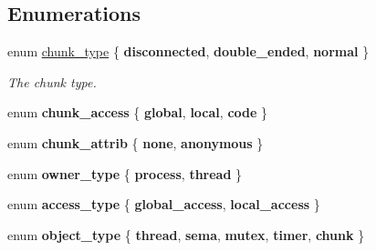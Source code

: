 \subsection*{Enumerations}
\begin{DoxyCompactItemize}
\item 
\mbox{\label{namespaceeka2l1_1_1kernel_aee9c57d72d8825de61cb11d4396438ed}} 
enum \mbox{\hyperlink{namespaceeka2l1_1_1kernel_aee9c57d72d8825de61cb11d4396438ed}{chunk\+\_\+type}} \{ {\bfseries disconnected}, 
{\bfseries double\+\_\+ended}, 
{\bfseries normal}
 \}
\begin{DoxyCompactList}\small\item\em The chunk type. \end{DoxyCompactList}\item 
\mbox{\label{namespaceeka2l1_1_1kernel_ad9cda4b7f935e4f86e1bb9c0fc10f4f1}} 
enum {\bfseries chunk\+\_\+access} \{ {\bfseries global}, 
{\bfseries local}, 
{\bfseries code}
 \}
\item 
\mbox{\label{namespaceeka2l1_1_1kernel_afb3129621b41f6abd9c9fd540f8019cc}} 
enum {\bfseries chunk\+\_\+attrib} \{ {\bfseries none}, 
{\bfseries anonymous}
 \}
\item 
\mbox{\label{namespaceeka2l1_1_1kernel_a73d7ed5a51f8fd3b766252ddcac1c84d}} 
enum {\bfseries owner\+\_\+type} \{ {\bfseries process}, 
{\bfseries thread}
 \}
\item 
\mbox{\label{namespaceeka2l1_1_1kernel_a75b23233cf475e247f5b66632ea72ab6}} 
enum {\bfseries access\+\_\+type} \{ {\bfseries global\+\_\+access}, 
{\bfseries local\+\_\+access}
 \}
\item 
\mbox{\label{namespaceeka2l1_1_1kernel_aa5a6cbdd9c35706691360d2879d2406a}} 
enum {\bfseries object\+\_\+type} \{ \newline
{\bfseries thread}, 
{\bfseries sema}, 
{\bfseries mutex}, 
{\bfseries timer}, 
\newline
{\bfseries chunk}
 \}
\item 
\mbox{\label{namespaceeka2l1_1_1kernel_a8226b7d7cca7969d43e792fff451a90e}} 

\end{DoxyCompactItemize}
